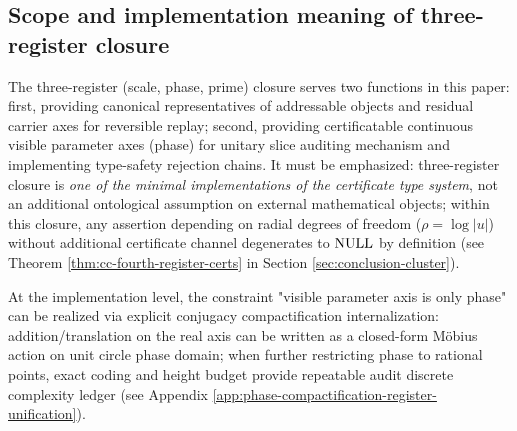 \subsection{Scope and implementation meaning of three-register closure}
The three-register (scale, phase, prime) closure serves two functions in this paper: first, providing canonical representatives of addressable objects and residual carrier axes for reversible replay; second, providing certificatable continuous visible parameter axes (phase) for unitary slice auditing mechanism and implementing type-safety rejection chains. It must be emphasized: three-register closure is \emph{one of the minimal implementations of the certificate type system}, not an additional ontological assumption on external mathematical objects; within this closure, any assertion depending on radial degrees of freedom ($\rho=\log|u|$) without additional certificate channel degenerates to $\mathrm{NULL}$ by definition (see Theorem \ref{thm:cc-fourth-register-certs} in Section \ref{sec:conclusion-cluster}).\par

At the implementation level, the constraint "visible parameter axis is only phase" can be realized via explicit conjugacy compactification internalization: addition/translation on the real axis can be written as a closed-form Möbius action on unit circle phase domain; when further restricting phase to rational points, exact coding and height budget provide repeatable audit discrete complexity ledger (see Appendix \ref{app:phase-compactification-register-unification}).\par

